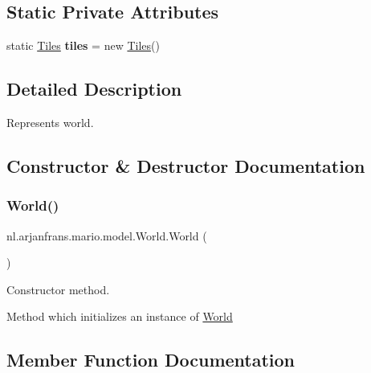 \subsection*{Static Private Attributes}
\begin{DoxyCompactItemize}
\item 
\mbox{\label{classnl_1_1arjanfrans_1_1mario_1_1model_1_1World_aef8372c71e575e10ccc7bf874d3f92f3}} 
static \hyperlink{classnl_1_1arjanfrans_1_1mario_1_1graphics_1_1Tiles}{Tiles} {\bfseries tiles} = new \hyperlink{classnl_1_1arjanfrans_1_1mario_1_1graphics_1_1Tiles}{Tiles}()
\end{DoxyCompactItemize}


\subsection{Detailed Description}
Represents world. 

\subsection{Constructor \& Destructor Documentation}
\mbox{\label{classnl_1_1arjanfrans_1_1mario_1_1model_1_1World_abc0eb7717682f6f00f139647207d425b}} 
\subsubsection{\texorpdfstring{World()}{World()}}
{\footnotesize\ttfamily nl.\+arjanfrans.\+mario.\+model.\+World.\+World (\begin{DoxyParamCaption}{ }\end{DoxyParamCaption})}



Constructor method. 

Method which initializes an instance of \hyperlink{classnl_1_1arjanfrans_1_1mario_1_1model_1_1World}{World} 

\subsection{Member Function Documentation}
\mbox{\label{classnl_1_1arjanfrans_1_1mario_1_1model_1_1World_a872a94f433d059bee4fa1e73afcce3e4}} 
